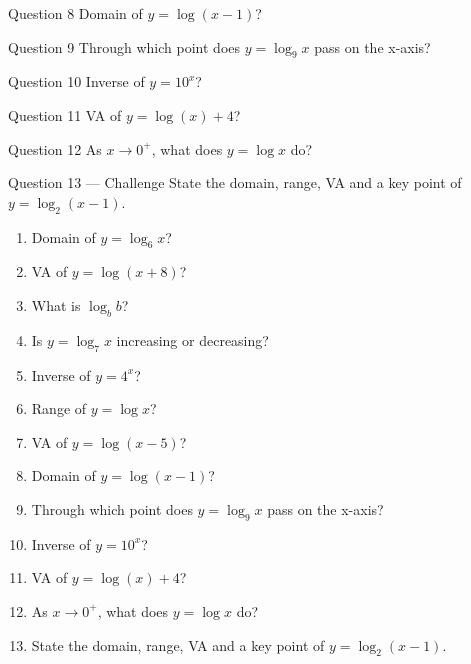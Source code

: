 \documentclass[11pt]{article}
\begin{document}
\begin{qbox}{Question 8}
Domain of $y=\log(x-1)$?\workspace{2.4cm}
\end{qbox}

\begin{qbox}{Question 9}
Through which point does $y=\log_9 x$ pass on the x-axis?\workspace{2.4cm}
\end{qbox}

\begin{qbox}{Question 10}
Inverse of $y=10^x$?\workspace{2.4cm}
\end{qbox}

\begin{qbox}{Question 11}
VA of $y=\log(x)+4$?\workspace{2.4cm}
\end{qbox}

\begin{qbox}{Question 12}
As $x\to0^+$, what does $y=\log x$ do?\workspace{2.4cm}
\end{qbox}

\begin{qbox}{Question 13 --- Challenge}
State the domain, range, VA and a key point of $y=\log_2(x-1)$.\workspace{3.5cm}
\end{qbox}

\clearpage
{}

\begin{recapbox}
\begin{multicols}{2}
\small
\begin{enumerate}[leftmargin=*,itemsep=3pt]
  \item Domain of $y=\log_6 x$?
  \item VA of $y=\log(x+8)$?
  \item What is $\log_b b$?
  \item Is $y=\log_7 x$ increasing or decreasing?
  \item Inverse of $y=4^x$?
  \item Range of $y=\log x$?
  \item VA of $y=\log(x-5)$?
  \item Domain of $y=\log(x-1)$?
  \item Through which point does $y=\log_9 x$ pass on the x-axis?
  \item Inverse of $y=10^x$?
  \item VA of $y=\log(x)+4$?
  \item As $x\to0^+$, what does $y=\log x$ do?
  \item State the domain, range, VA and a key point of $y=\log_2(x-1)$.
\end{enumerate}
\end{multicols}
\end{recapbox}
\end{document}
